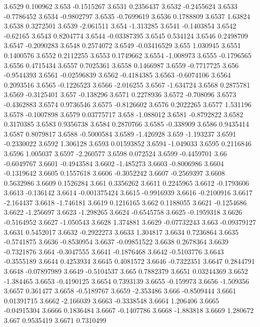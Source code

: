 3.6529  0.100962
3.653  -0.1515267
3.6531  0.2356437
3.6532  -0.2455624
3.6533  -0.7786452
3.6534  -0.9802797
3.6535  -0.7699619
3.6536  0.1788809
3.6537  1.63824
3.6538  0.3272501
3.6539  -2.061511
3.654  -1.313285
3.6541  -0.1403854
3.6542  -0.62165
3.6543  0.8204774
3.6544  -0.03387395
3.6545  0.534124
3.6546  0.2498709
3.6547  -0.2090283
3.6548  0.2574072
3.6549  -0.03416529
3.655  1.030945
3.6551  0.1400576
3.6552  0.2112255
3.6553  0.1749662
3.6554  -1.008973
3.6555  -0.1796565
3.6556  0.4715434
3.6557  0.7025361
3.6558  0.1466987
3.6559  -0.7717725
3.656  -0.9544393
3.6561  -0.02596839
3.6562  -0.4184385
3.6563  -0.6074106
3.6564  0.2093516
3.6565  -0.1226523
3.6566  -2.016255
3.6567  -1.634724
3.6568  0.2875781
3.6569  -0.3125401
3.657  -0.138296
3.6571  0.2278936
3.6572  -0.708096
3.6573  -0.4362883
3.6574  0.9736546
3.6575  -0.8126602
3.6576  0.2022265
3.6577  1.531196
3.6578  -0.1007898
3.6579  0.03775717
3.658  -1.088012
3.6581  -0.8792822
3.6582  0.3170385
3.6583  0.9356738
3.6584  0.2870766
3.6585  -0.338909
3.6586  0.9435414
3.6587  0.8079817
3.6588  -0.5000584
3.6589  -1.426928
3.659  -1.193237
3.6591  -0.2330022
3.6592  1.306128
3.6593  0.01593852
3.6594  -1.049033
3.6595  0.2116846
3.6596  1.005037
3.6597  -2.260577
3.6598  0.072524
3.6599  -0.4459701
3.66  -0.6049767
3.6601  -0.4943584
3.6602  -1.485273
3.6603  -0.8006986
3.6604  -0.1319642
3.6605  0.1557618
3.6606  -0.3052242
3.6607  -0.2569397
3.6608  0.5632986
3.6609  0.1526284
3.661  0.3356262
3.6611  0.2245965
3.6612  -0.1793606
3.6613  -0.136142
3.6614  -0.001375424
3.6615  -0.9916939
3.6616  -0.2100916
3.6617  -2.164437
3.6618  -1.746181
3.6619  0.1216165
3.662  0.1188055
3.6621  -0.1254686
3.6622  -1.256697
3.6623  -1.298265
3.6624  -0.6545758
3.6625  -0.1959318
3.6626  -0.5164952
3.6627  -1.050543
3.6628  1.374881
3.6629  -0.07732243
3.663  -0.09379127
3.6631  0.5452017
3.6632  -0.2922273
3.6633  1.304817
3.6634  0.7236864
3.6635  -0.5741875
3.6636  -0.8530954
3.6637  -0.09851522
3.6638  0.2678364
3.6639  -0.7321876
3.664  -0.3047555
3.6641  -0.1876468
3.6642  -0.5103776
3.6643  -0.3555189
3.6644  0.4253934
3.6645  0.4081572
3.6646  -0.7322351
3.6647  0.2844791
3.6648  -0.07897989
3.6649  -0.5104537
3.665  0.7882379
3.6651  0.03244369
3.6652  -1.384465
3.6653  -0.4190125
3.6654  0.7393139
3.6655  -0.159973
3.6656  -1.509356
3.6657  0.361477
3.6658  -0.5189767
3.6659  -2.353486
3.666  -0.8509444
3.6661  0.01391715
3.6662  -2.166039
3.6663  -0.3338548
3.6664  1.206406
3.6665  -0.04915304
3.6666  0.1836484
3.6667  -0.1407786
3.6668  -1.883818
3.6669  1.280672
3.667  0.9535419
3.6671  0.7310499
